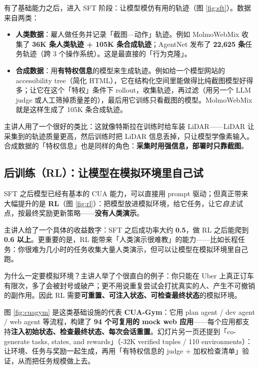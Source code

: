 ﻿\documentclass[a4paper]{article}
\begin{document}
有了基础能力之后，进入 SFT 阶段：让模型模仿有用的轨迹（图 \ref{fig:sft}）。数据来自两类：

\begin{itemize}
\item \textbf{人类数据}：雇人做任务并记录「截图—动作」轨迹。例如 MolmoWebMix 收集了 \textbf{36K 条人类轨迹 + 105K 条合成轨迹}；AgentNet 发布了 \textbf{22,625 条}任务轨迹（跨 3 个操作系统）。这是最直接的「行为克隆」。
\item \textbf{合成数据}：用\textbf{有特权信息}的模型来生成轨迹。例如给一个模型网站的 accessibility tree（简化 HTML），它在结构化空间里能做得比纯截图模型好得多；让它在这个「特权」条件下 rollout，收集轨迹，再过滤（用另一个 LLM judge 或人工筛掉质量差的），最后用它训练只看截图的模型。MolmoWebMix 就是这样生成了 105K 条合成轨迹。
\end{itemize}

主讲人用了一个很好的类比：这就像特斯拉在训练时给车装 LiDAR——LiDAR 让采集到的轨迹质量更高，然后训练时把 LiDAR 信息丢掉，只让模型学像素输入。合成数据的「特权信息」也是同样的角色：\textbf{采集时用强信息，部署时只靠截图}。

\subsection{后训练（RL）：让模型在模拟环境里自己试}

SFT 之后模型已经有基本的 CUA 能力，可以直接用 prompt 驱动；但真正带来大幅提升的是 \textbf{RL}（图 \ref{fig:rl}）：把模型放进模拟环境，给它任务，让它\emph{自主}试点，按最终奖励更新策略——\textbf{没有人类演示}。

主讲人给了一个具体的收益数字：SFT 之后成功率大约 \textbf{0.5}，做 RL 之后能爬到 \textbf{0.6 以上}。更重要的是，RL 能带来「人类演示很难教」的能力——比如长程任务：你很难为几小时的任务收集大量人类演示，但可以让模型在模拟环境里自己跑。

为什么一定要模拟环境？主讲人举了个很直白的例子：你只能在 Uber 上真正订车有限次，多了会被封号或破产；更不用说重复尝试会打扰真实的人、产生不可撤销的副作用。因此 RL 需要\textbf{可重置、可注入状态、可检查最终状态}的模拟环境。

图 \ref{fig:cuagym} 是这类基础设施的代表 \textbf{CUA-Gym}：它用 plan agent / dev agent / web agent 等流程，构建了 \textbf{94 个可复用的 mock web 应用}——每个应用都支持\textbf{注入初始状态、检查最终状态、每次会话重置}。幻灯片另一页还提到「co-generate tasks, states, and rewards」（-32K verified tuples / 110 environments）：让环境、任务与奖励一起生成，再用「有特权信息的 judge + 加权检查清单」验证，从而把任务规模做上去。
\end{document}
